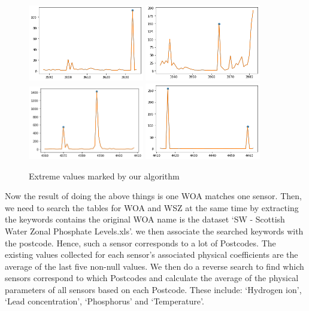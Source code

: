 \documentclass[11pt,twoside]{article}
\numberwithin{Theorem}{section}
\numberwithin{Definition}{section}
\numberwithin{Lemma}{section}
\numberwithin{Algorithm}{section}
\numberwithin{equation}{section}
\begin{document}
\begin{figure}[!ht]
    \centering
    \includegraphics[width=0.45\textwidth]{p4.png}
    \includegraphics[width=0.45\textwidth]{p5.png}\\
    \includegraphics[width=0.45\textwidth]{p6.png}
    \includegraphics[width=0.45\textwidth]{p7.png}
    \caption{Extreme values marked by our algorithm}
    \end{figure}

Now the result of doing the above things is one WOA matches one sensor. Then, we need to search the tables for WOA and WSZ at the same time by extracting the keywords contains the original WOA name is the dataset ‘SW - Scottish Water Zonal Phosphate Levels.xls’. we then associate the searched keywords with the postcode. Hence, such a sensor corresponds to a lot of Postcodes. The existing values collected for each sensor's associated physical coefficients are the average of the last five non-null values. We then do a reverse search to find which sensors correspond to which Postcodes and calculate the average of the physical parameters of all sensors based on each Postcode. These include: ‘Hydrogen ion’, ‘Lead concentration’, ‘Phosphorus’ and ‘Temperature’.
\end{document}
